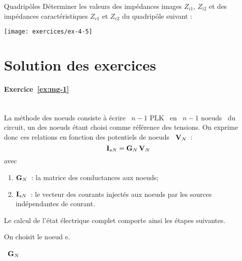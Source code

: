 \begin{exercise}{Quadripôles}\label{ex:mg-19}
Déterminer les valeurs des impédances images $Z_{i1}$, $Z_{i2}$
et des impédances caractéristiques $Z_{c1}$ et $Z_{c2}$ du quadripôle suivant :
\begin{center}
	\texttt{[image: exercices/ex-4-5]}
\end{center}
\end{exercise}



\section{Solution des exercices}

\paragraph{Exercice~\ref{ex:mg-1}}~\\%

La méthode des noeuds consiste à écrire \ $n-1$ PLK \ en \
$n-1$ noeuds \ du circuit, un des noeuds étant choisi comme référence
des tensions. On exprime donc ces relations en fonction des potentiels
de noeuds \ ${\bf V}_N$~:
\[ {\bf I}_{sN} = {\bf G}_{N}\, {\bf V}_{N} \]
avec
\begin{enumerate}
	\item ${\bf G}_{N}$~: la matrice des conductances aux noeuds;
	\item ${\bf I}_{sN}$~: le vecteur des courants injectés aux noeuds
	par les sources indépendantes de courant.
\end{enumerate}
Le calcul de l'état électrique complet comporte ainsi les étapes suivantes.


On choisit le noeud e.

 \ ${\bf G}_N$ 

